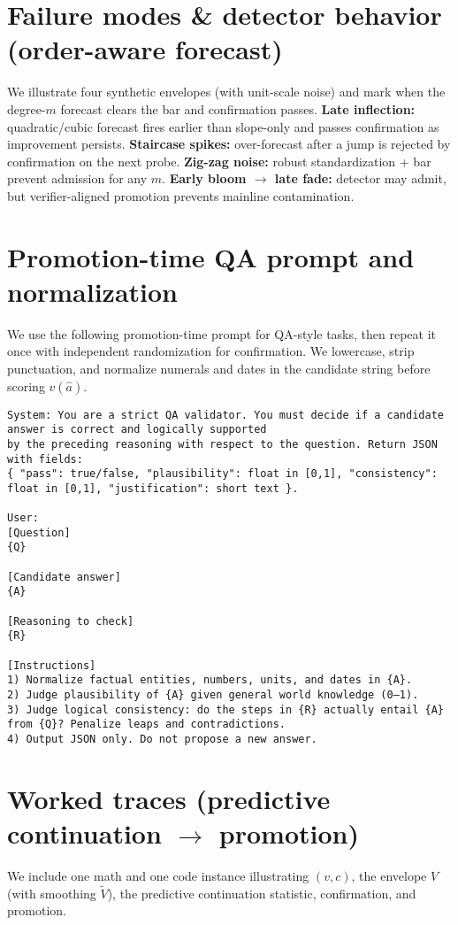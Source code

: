 \documentclass{article}
\begin{document}
\section{Failure modes \& detector behavior (order-aware forecast)}
We illustrate four synthetic envelopes (with unit-scale noise) and mark when the degree-$m$ forecast clears the bar and confirmation passes.
\textbf{Late inflection:} quadratic/cubic forecast fires earlier than slope-only and passes confirmation as improvement persists.
\textbf{Staircase spikes:} over-forecast after a jump is rejected by confirmation on the next probe.
\textbf{Zig-zag noise:} robust standardization + bar prevent admission for any $m$.
\textbf{Early bloom $\to$ late fade:} detector may admit, but verifier-aligned promotion prevents mainline contamination.

\section{Promotion-time QA prompt and normalization}
\label{app:qa-prompt}
We use the following promotion-time prompt for QA-style tasks, then repeat it once with independent randomization for confirmation.
We lowercase, strip punctuation, and normalize numerals and dates in the candidate string before scoring $v(\hat a)$.
\begin{verbatim}
System: You are a strict QA validator. You must decide if a candidate answer is correct and logically supported
by the preceding reasoning with respect to the question. Return JSON with fields:
{ "pass": true/false, "plausibility": float in [0,1], "consistency": float in [0,1], "justification": short text }.

User:
[Question]
{Q}

[Candidate answer]
{A}

[Reasoning to check]
{R}

[Instructions]
1) Normalize factual entities, numbers, units, and dates in {A}.
2) Judge plausibility of {A} given general world knowledge (0–1).
3) Judge logical consistency: do the steps in {R} actually entail {A} from {Q}? Penalize leaps and contradictions.
4) Output JSON only. Do not propose a new answer.
\end{verbatim}

\section{Worked traces (predictive continuation $\to$ promotion)}
\label{app:worked-traces}
We include one math and one code instance illustrating $(v,c)$, the envelope $V$ (with smoothing $\tilde V$), the predictive continuation statistic, confirmation, and promotion.
\end{document}
